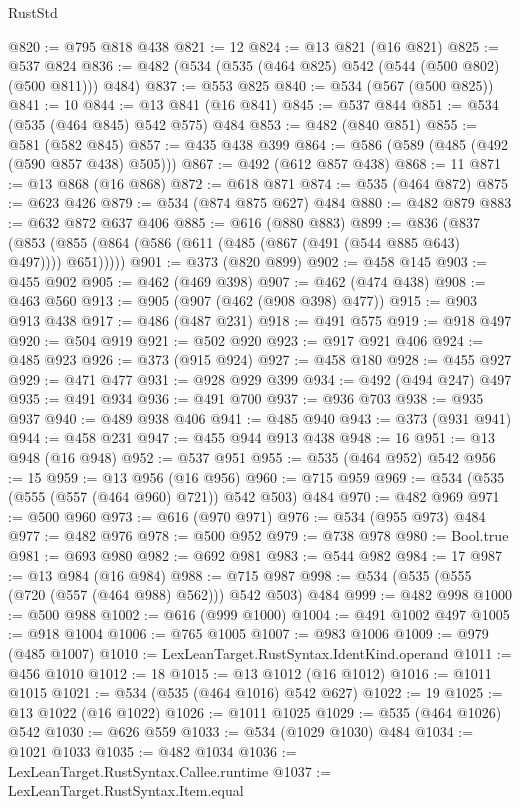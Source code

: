 \begin{lexlean}{RustStd}
\begin{coremodule}
@820 := @795 @818 @438
@821 := 12
@824 := @13 @821 (@16 @821)
@825 := @537 @824
@836 := @482 (@534 (@535 (@464 @825) @542 (@544 (@500 @802) (@500 @811))) @484)
@837 := @553 @825
@840 := @534 (@567 (@500 @825))
@841 := 10
@844 := @13 @841 (@16 @841)
@845 := @537 @844
@851 := @534 (@535 (@464 @845) @542 @575) @484
@853 := @482 (@840 @851)
@855 := @581 (@582 @845)
@857 := @435 @438 @399
@864 := @586 (@589 (@485 (@492 (@590 @857 @438) @505)))
@867 := @492 (@612 @857 @438)
@868 := 11
@871 := @13 @868 (@16 @868)
@872 := @618 @871
@874 := @535 (@464 @872)
@875 := @623 @426
@879 := @534 (@874 @875 @627) @484
@880 := @482 @879
@883 := @632 @872 @637 @406
@885 := @616 (@880 @883)
@899 := @836
    (@837 (@853 (@855 (@864 (@586 (@611 (@485 (@867 (@491 (@544 @885 @643) @497)))) @651)))))
@901 := @373 (@820 @899)
@902 := @458 @145
@903 := @455 @902
@905 := @462 (@469 @398)
@907 := @462 (@474 @438)
@908 := @463 @560
@913 := @905 (@907 (@462 (@908 @398) @477))
@915 := @903 @913 @438
@917 := @486 (@487 @231)
@918 := @491 @575
@919 := @918 @497
@920 := @504 @919
@921 := @502 @920
@923 := @917 @921 @406
@924 := @485 @923
@926 := @373 (@915 @924)
@927 := @458 @180
@928 := @455 @927
@929 := @471 @477
@931 := @928 @929 @399
@934 := @492 (@494 @247) @497
@935 := @491 @934
@936 := @491 @700
@937 := @936 @703
@938 := @935 @937
@940 := @489 @938 @406
@941 := @485 @940
@943 := @373 (@931 @941)
@944 := @458 @231
@947 := @455 @944 @913 @438
@948 := 16
@951 := @13 @948 (@16 @948)
@952 := @537 @951
@955 := @535 (@464 @952) @542
@956 := 15
@959 := @13 @956 (@16 @956)
@960 := @715 @959
@969 := @534 (@535 (@555 (@557 (@464 @960) @721)) @542 @503) @484
@970 := @482 @969
@971 := @500 @960
@973 := @616 (@970 @971)
@976 := @534 (@955 @973) @484
@977 := @482 @976
@978 := @500 @952
@979 := @738 @978
@980 := Bool.true
@981 := @693 @980
@982 := @692 @981
@983 := @544 @982
@984 := 17
@987 := @13 @984 (@16 @984)
@988 := @715 @987
@998 := @534 (@535 (@555 (@720 (@557 (@464 @988) @562))) @542 @503) @484
@999 := @482 @998
@1000 := @500 @988
@1002 := @616 (@999 @1000)
@1004 := @491 @1002 @497
@1005 := @918 @1004
@1006 := @765 @1005
@1007 := @983 @1006
@1009 := @979 (@485 @1007)
@1010 := LexLeanTarget.RustSyntax.IdentKind.operand
@1011 := @456 @1010
@1012 := 18
@1015 := @13 @1012 (@16 @1012)
@1016 := @1011 @1015
@1021 := @534 (@535 (@464 @1016) @542 @627)
@1022 := 19
@1025 := @13 @1022 (@16 @1022)
@1026 := @1011 @1025
@1029 := @535 (@464 @1026) @542
@1030 := @626 @559
@1033 := @534 (@1029 @1030) @484
@1034 := @1021 @1033
@1035 := @482 @1034
@1036 := LexLeanTarget.RustSyntax.Callee.runtime
@1037 := LexLeanTarget.RustSyntax.Item.equal

\end{coremodule}
\end{lexlean}
